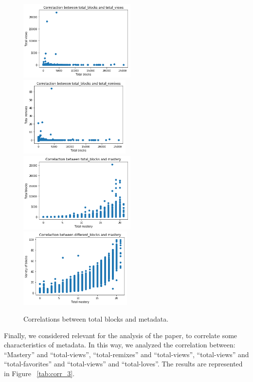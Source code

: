 \documentclass[a4paper,twocolumn,10pt]{article}
\begin{document}
\begin{figure}
\begin{center}
\includegraphics[height=4cm]{images/3.png}
\includegraphics[height=4cm]{images/4.png}
\includegraphics[height=4cm]{images/5.png}
\includegraphics[height=4cm]{images/6.png}
\caption{Correlations between total blocks and metadata.}
\label{tab:corr_2}
\end{center}
\end{figure}

Finally, we considered relevant for the analysis of the paper, to correlate some
characteristics of metadata. In this way, we analyzed the correlation between: 
``Mastery'' and ``total-views'', ``total-remixes'' and ``total-views'',
``total-views'' and ``total-favorites'' and ``total-views'' and ``total-loves''.
The results are represented in Figure ~\ref{tab:corr_3}.
\end{document}
